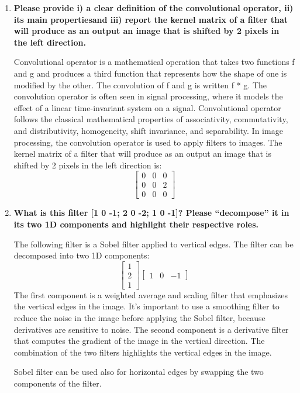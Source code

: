 \documentclass[12pt]{article}
\begin{document}
\begin{enumerate}
    \item \textbf{Please provide i) a clear definition of the convolutional operator, ii) its main propertiesand iii)
              report the kernel matrix of a filter that will produce as an output an image that is shifted by 2 pixels in the left direction.}

          Convolutional operator is a mathematical operation that takes two functions f and g and produces a third function that represents how the shape of one is modified by the other.
          The convolution of f and g is written f * g. The convolution operator is often seen in signal processing, where it models the effect of a linear time-invariant system on a signal.
          Convolutional operator follows the classical mathematical properties of associativity, commutativity, and distributivity, homogeneity, shift invariance, and separability.
          In image processing, the convolution operator is used to apply filters to images.
          The kernel matrix of a filter that will produce as an output an image that is shifted by 2 pixels in the left direction is:
          \[
              \begin{bmatrix}
                  0 & 0 & 0 \\
                  0 & 0 & 2 \\
                  0 & 0 & 0
              \end{bmatrix}
          \]

    \item \textbf{What is this filter [1 0 -1; 2 0 -2; 1 0 -1]?  Please “decompose” it in its two 1D components and highlight their respective roles.}

          The following filter is a Sobel filter applied to vertical edges. The filter can be decomposed into two 1D components:
          \[
              \begin{bmatrix}
                  1 \\
                  2 \\
                  1
              \end{bmatrix}
              \begin{bmatrix}
                  1 & 0 & -1
              \end{bmatrix}
          \]
          The first component is a weighted average and scaling filter that emphasizes the vertical edges in the image.
          It's important to use a smoothing filter to reduce the noise in the image before applying the Sobel filter, because derivatives are sensitive to noise.
          The second component is a derivative filter that computes the gradient of the image in the vertical direction.
          The combination of the two filters highlights the vertical edges in the image.

          Sobel filter can be used also for horizontal edges by swapping the two components of the filter.
\end{enumerate}
\end{document}
